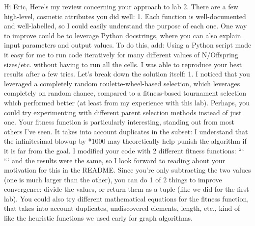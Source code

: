 Hi Eric,\markdownRendererInterblockSeparator
{}Here's my review concerning your approach to lab 2.\markdownRendererInterblockSeparator
{}There are a few high-level, cosmetic attributes you did well: 1. Each function is well-documented and well-labelled, so I could easily understand the purpose of each one. One way to improve could be to leverage Python docstrings, where you can also explain input parameters and output values. To do this, add: \markdownRendererInterblockSeparator
{}\markdownRendererOlBeginTight
{}Using a Python script made it easy for me to run code iteratively for many different values of N/Offspring sizes/etc. without having to run all the cells. I was able to reproduce your best results after a few tries.\markdownRendererOlItemEnd 
\markdownRendererOlEndTight \markdownRendererInterblockSeparator
{}Let's break down the solution itself: 1. I noticed that you leveraged a completely random roulette-wheel-based selection, which leverages completely on random chance, compared to a fitness-based tournament selection which performed better (at least from my experience with this lab). Perhaps, you could try experimenting with different parent selection methods instead of just one.\markdownRendererInterblockSeparator
{}\markdownRendererOlBeginTight
{}Your fitness function is particularly interesting, standing out from most others I've seen. It takes into account duplicates in the subset:\markdownRendererOlItemEnd 
\markdownRendererOlEndTight \markdownRendererInterblockSeparator
{}\markdownRendererInterblockSeparator
{}I understand that the infinitesimal blowup by \markdownRendererDollarSign{}*1000\markdownRendererDollarSign{} may theoretically help punish the algorithm if it is far from the goal. I modified your code with 2 different fitness functions:  ```\markdownRendererInterblockSeparator
{} ``` and the results were the same, so I look forward to reading about your motivation for this in the README. Since you're only subtracting the two values (one is much larger than the other), you can do 1 of 2 things to improve convergence: divide the values, or return them as a tuple (like we did for the first lab). You could also try different mathematical equations for the fitness function, that takes into account duplicates, undiscovered elements, length, etc., kind of like the heuristic functions we used early for graph algorithms.\markdownRendererInterblockSeparator
